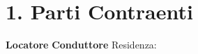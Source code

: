 \section*{1. Parti Contraenti}
\textbf{Locatore}
\ContractLandlordsIT
\vspace{0.5cm}
\textbf{Conduttore}
\ContractTenantsIT
Residenza: \Propaddress

